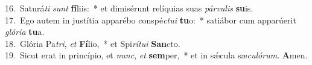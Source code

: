 {16.~}Saturá\textit{ti} \textit{sunt} \textbf{fí}liis:~* et dimisérunt relíquias suas \textit{pár}\textit{vu}\textit{lis} \textbf{su}is.\\
{17.~}Ego autem in justítia apparébo conspé\textit{ctu}\textit{i} \textbf{tu}o:~* satiábor cum apparúerit \textit{gló}\textit{ri}\textit{a} \textbf{tu}a.\\
{18.~}Glória Pa\textit{tri}, \textit{et} \textbf{Fí}lio,~* et Spi\textit{rí}\textit{tu}\textit{i} \textbf{San}cto.\\
{19.~}Sicut erat in princípio, et \textit{nunc}, \textit{et} \textbf{sem}per,~* et in sǽcula sæ\textit{cu}\textit{ló}\textit{rum}. \textbf{A}men.\\
